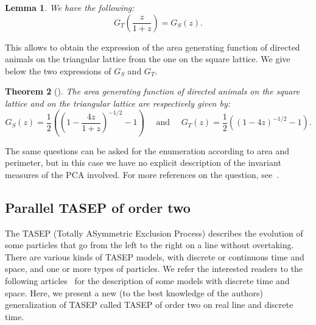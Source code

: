 \documentclass[10pt]{amsart}
\newtheorem{theo}{Theorem}[section]
\newtheorem{lemm}[theo]{Lemma}\newtheorem{prop}[theo]{Proposition}\newtheorem{coro}[theo]{Corollary}\newtheorem{conj}[theo]{Conjecture}
\theoremstyle{definition}\newtheorem{defi}[theo]{Definition}\newtheorem{rema}[theo]{Remark}\newtheorem{exam}[theo]{Example}\newtheorem{exem}[theo]{Example}\newtheorem{nota}[theo]{Notation}
\newcounter{a}
\begin{document}
\begin{lemm}\label{lem:eq}
We have the following:
\begin{equation}\label{eq:eq}
G_T\left(\frac{z}{1+z}\right) = G_S(z).
\end{equation}
\end{lemm}

This allows to obtain the expression of the area generating function of directed animals on the triangular lattice from the one on the square lattice. We give below the two expressions of $G_S$ and $G_T$.

\begin{theo}[\cite{BousquetMelou98,Dhar82}]
The area generating function of directed animals on the square lattice and on the triangular lattice are respectively given by:
\begin{equation*}
G_S(z) = \frac{1}{2} \left(\left(1 - \frac{4z}{1+z} \right)^{-1/2} - 1 \right) \quad \text{ and } \quad G_T(z) = \frac{1}{2} \left(\left(1 - 4z \right)^{-1/2} - 1 \right).
\end{equation*}
\end{theo}

The same questions can be asked for the enumeration according to area and perimeter, but in this case we have no explicit description of the invariant measures of the PCA involved. For more references on the question, see~\cite{LBM07,mm_tcs}.

\subsection{Parallel TASEP of order two} \label{sec:TASEP}

The TASEP (Totally ASymmetric Exclusion Process) describes the evolution of some particles that go from the left to the right on a line without overtaking. There are various kinds of TASEP models, with discrete or continuous time and space, and one or more types of particles. We refer the interested readers to the following articles~\cite{BC15,belitsky,gray} for the description of some models with discrete time and space. Here, we present a new (to the best knowledge of the authors) generalization of TASEP called TASEP of order two on real line and discrete time.
\end{document}
